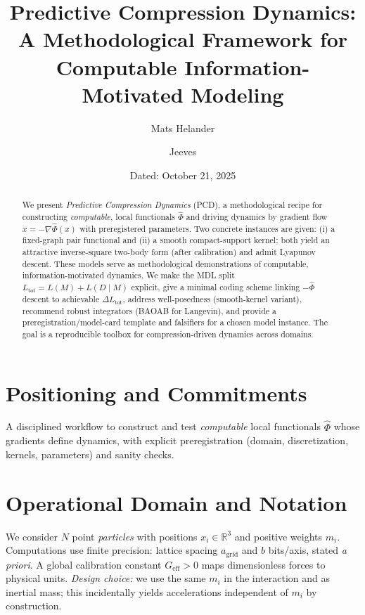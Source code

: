 \documentclass[11pt,a4paper]{article}
\title{\bf Predictive Compression Dynamics:\\
A Methodological Framework for Computable Information-Motivated Modeling}
\author[1]{Mats Helander}
\author[1]{Jeeves}
\affil[1]{Independent Research}
\date{Dated: October 21, 2025}
\numberwithin{equation}{section}
\newcommand{\R}{\mathbb{R}}
\begin{document}
\maketitle

\begin{abstract}
\noindent
We present \emph{Predictive Compression Dynamics} (PCD), a methodological recipe for constructing \emph{computable}, local functionals $\widehat{\Phi}$ and driving dynamics by gradient flow $\dot x=-\nabla\widehat{\Phi}(x)$ with preregistered parameters. Two concrete instances are given: (i) a fixed-graph pair functional and (ii) a smooth compact-support kernel; both yield an attractive inverse-square two-body form (after calibration) and admit Lyapunov descent. These models serve as methodological demonstrations of computable, information-motivated dynamics. We make the MDL split $L_{\text{tot}}=L(M)+L(D\mid M)$ explicit, give a minimal coding scheme linking $-\widehat{\Phi}$ descent to achievable $\Delta L_{\text{tot}}$, address well-posedness (smooth-kernel variant), recommend robust integrators (BAOAB for Langevin), and provide a preregistration/model-card template and falsifiers for a chosen model instance. The goal is a reproducible toolbox for compression-driven dynamics across domains.
\end{abstract}

\section{Positioning and Commitments}
A disciplined workflow to construct and test \emph{computable} local functionals $\widehat{\Phi}$ whose gradients define dynamics, with explicit preregistration (domain, discretization, kernels, parameters) and sanity checks.

\section{Operational Domain and Notation}
We consider $N$ point \emph{particles} with positions $x_i\in\R^3$ and positive weights $m_i$. Computations use finite precision: lattice spacing $a_{\text{grid}}$ and $b$ bits/axis, stated \emph{a priori}. A global calibration constant $G_{\text{eff}}>0$ maps dimensionless forces to physical units. \emph{Design choice:} we use the same $m_i$ in the interaction and as inertial mass; this incidentally yields accelerations independent of $m_i$ by construction.
\end{document}
